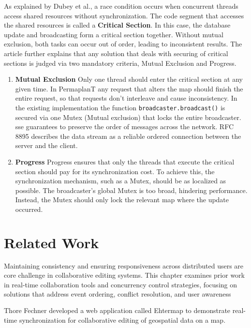 \documentclass[final,oneside]{vutinfth}
\begin{document}
As explained by Dubey et al.\cite{artice_race_condition_and_dynamic_data_race_detection}, a race condition occurs when concurrent threads access shared resources without synchronization.
The code segment that accesses the shared resources is called a \textbf{Critical Section}.
In this case, the database update and broadcasting form a critical section together.
Without mutual exclusion, both tasks can occur out of order, leading to inconsistent results.
The article further explains that any solution that deals with securing of critical sections is judged via two mandatory criteria, Mutual Exclusion and Progress.
\begin{enumerate}
    \item \textbf{Mutual Exclusion}
    Only one thread should enter the critical section at any given time.
    In PermaplanT any request that alters the map should finish the entire request, so that requests don't interleave and cause inconsistency.
    In the existing implementation the function \texttt{broadcaster.broadcast()} is secured via one Mutex (Mutual exclusion) that locks the entire broadcaster.
    \gls{sse} guarantees to preserve the order of messages across the network.
    RFC 8895 \cite{rfc8895sse} describes the data stream as a reliable ordered connection between the server and the client.
    
    \item \textbf{Progress}
    Progress ensures that only the threads that execute the critical section should pay for its synchronization cost.
    To achieve this, the synchronization mechanism, such as a Mutex, should be as localized as possible.
    The broadcaster's global Mutex is too broad, hindering performance.
    Instead, the Mutex should only lock the relevant map where the update occurred.
\end{enumerate}

\chapter{Related Work}\label{chap:related_work}

Maintaining consistency and ensuring responsiveness across distributed users are core challenge in collaborative editing systems.
This chapter examines prior work in real-time collaboration tools and concurrency control strategies, focusing on solutions that address event ordering, conflict resolution, and user awareness

Thore Fechner developed a web application called Ehtermap to demonstrate real-time synchronization for collaborative editing of geospatial data on a map\cite{ethermap}.
\end{document}
